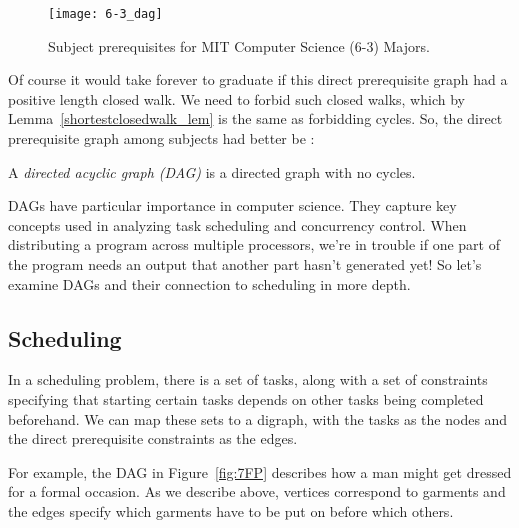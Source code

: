 \begin{figure}

\texttt{[image: 6-3\_dag]}

\caption{Subject prerequisites for MIT Computer Science (6-3) Majors.}

\label{6-3_subjects}

\end{figure}

Of course it would take forever to graduate if this direct prerequisite
graph had a positive length closed walk.  We need to forbid such
closed walks, which by Lemma~\ref{shortestclosedwalk_lem} is the same
as forbidding cycles.  So, the direct prerequisite
graph among subjects had better be :

\begin{definition}
A \emph{directed acyclic graph (DAG)}%
%
is a directed graph with no cycles.
\end{definition}

DAGs have particular importance in computer science.  They capture key
concepts used in analyzing task scheduling and concurrency control.
When distributing a program across multiple processors, we're in
trouble if one part of the program needs an output that another part
hasn't generated yet!  So let's examine DAGs and their connection to
scheduling in more depth.

\iffalse
We won't be working on any examples quite so
technical in this chapter, but\fi


\subsection{Scheduling}\label{sched_subsec}

In a scheduling problem, there is a set of tasks, along with a set of
constraints specifying that starting certain tasks depends on other
tasks being completed beforehand.  We can map these sets to a digraph,
with the tasks as the nodes and the direct prerequisite constraints as
the edges.

For example, the DAG in Figure~\ref{fig:7FP} describes how a man might
get dressed for a formal occasion.  As we describe above, vertices
correspond to garments and the edges specify which garments have to be
put on before which others.

